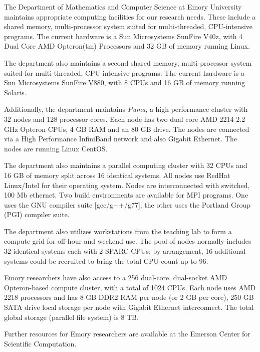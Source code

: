 
The Department of Mathematics and Computer Science at Emory University
maintains appropriate computing facilities for our research needs. These
include a shared memory, multi-processor system suited for multi-threaded,
CPU-intensive programs. The current hardware is a Sun Microsystems SunFire
V40z, with 4 Dual Core AMD Opteron(tm) Processors and 32 GB of memory running
Linux.

The department also maintains a second shared memory, multi-processor system
 suited for multi-threaded, CPU intensive programs. The current hardware is a
 Sun Microsystems SunFire V880, with 8 CPUs and 16 GB of memory running
 Solaris.

Additionally, the department maintains {\em Puma}, a high performance cluster
with 32 nodes and 128 processor cores. Each node has two dual core AMD 2214
2.2 GHz Opteron CPUs, 4 GB RAM and an 80 GB drive.  The nodes are connected
via a High Performance InfiniBand network and also Gigabit Ethernet. The nodes
are running Linux CentOS.

The department also maintains a parallel computing cluster with 32 CPUs and 16
GB of memory split across 16 identical systems.  All nodes use RedHat
Linux/Intel for their operating system.  Nodes are interconnected with
switched, 100 Mb ethernet.  Two build environments are available for MPI
programs.  One uses the GNU compiler suite [gcc/g++/g77]; the other uses the
Portland Group (PGI) compiler suite.

The department also utilizes workstations from the teaching lab to form a
compute grid for off-hour and weekend use.  The pool of nodes normally
includes 32 identical systems each with 2 SPARC CPUs; by arrangement, 16
additional systems could be recruited to bring the total CPU count up to 96.

Emory researchers have also access to a 256 dual-core, dual-socket AMD
Opteron-based compute cluster, with a total of 1024 CPUs.  Each node uses AMD
2218 processors and has 8 GB DDR2 RAM per node (or 2 GB per core), 250 GB SATA
drive local storage per node with Gigabit Ethernet interconnect.  The total
global storage (parallel file system) is 8 TB.

Further resources for Emory researchers are available at the Emerson Center
for Scientific Computation.

\pagebreak
\endinput


